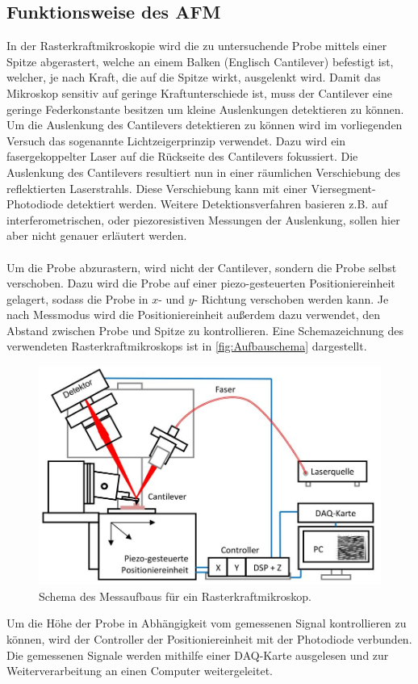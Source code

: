 \subsection{Funktionsweise des AFM}
\label{subsec:afmfunk}
In der Rasterkraftmikroskopie wird die zu untersuchende Probe mittels einer Spitze abgerastert, welche an einem Balken (Englisch Cantilever) befestigt ist, welcher, je nach Kraft, die auf die Spitze wirkt, ausgelenkt wird.
Damit das Mikroskop sensitiv auf geringe Kraftunterschiede ist, muss der Cantilever eine geringe Federkonstante besitzen um kleine Auslenkungen detektieren zu können. Um die Auslenkung des Cantilevers detektieren zu können wird im vorliegenden Versuch das sogenannte Lichtzeigerprinzip verwendet. Dazu wird ein fasergekoppelter Laser auf die Rückseite des Cantilevers fokussiert. Die Auslenkung des Cantilevers resultiert nun in einer räumlichen Verschiebung des reflektierten Laserstrahls. Diese Verschiebung kann mit einer Viersegment-Photodiode detektiert werden. Weitere Detektionsverfahren basieren z.B. auf interferometrischen, oder piezoresistiven Messungen der Auslenkung, sollen hier aber nicht genauer erläutert werden.\\
\\
Um die Probe abzurastern, wird nicht der Cantilever, sondern die Probe selbst verschoben. Dazu wird die Probe auf einer piezo-gesteuerten Positioniereinheit gelagert, sodass die Probe in $x$- und $y$- Richtung verschoben werden kann. Je nach Messmodus wird die Positioniereinheit außerdem dazu verwendet, den Abstand zwischen Probe und Spitze zu kontrollieren. Eine Schemazeichnung des verwendeten Rasterkraftmikroskops ist in \autoref{fig:Aufbauschema} dargestellt.
\begin{figure}[H]
\centering
  \includegraphics[width=\textwidth]{content/plots/Aufbau.jpg}
  \caption{Schema des Messaufbaus für ein Rasterkraftmikroskop. \cite{afm_datasheet}}
  \label{fig:Aufbauschema}
\end{figure}
Um die Höhe der Probe in Abhängigkeit vom gemessenen Signal kontrollieren zu können, wird der Controller
der Positioniereinheit mit der Photodiode verbunden. Die gemessenen Signale werden mithilfe einer DAQ-Karte ausgelesen und zur Weiterverarbeitung an einen Computer weitergeleitet.

